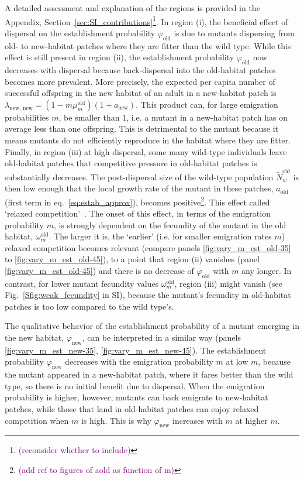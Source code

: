 \documentclass[11pt]{article}
\newcommand{\florence}[1]{\textcolor{purple}{(#1)}} %
\begin{document}
A detailed assessment and explanation of the regions is provided in the Appendix, Section~\ref{sec:SI_contributions}\footnote{\florence{reconsider whether to include}}. In region (i), the beneficial effect of dispersal on the establishment probability $\varphi_{\text{old}}$ is due to mutants dispersing from old- to new-habitat patches where they are fitter than the wild type. 
While this effect is still present in region (ii), the establishment probability $\varphi_{\text{old}}$ now decreases with dispersal   because back-dispersal into the old-habitat patches becomes more prevalent. More precisely, the expected per capita number of successful offspring in the new habitat of an adult in a new-habitat patch is $\lambda_{\text{new, new}} = (1- m \mu_m^{\text{old}}) (1+a_{\text{new}})$. This product can, for large emigration probabilities $m$, be smaller than $1$, i.e. a mutant in a new-habitat patch has on average less than one offspring. This is detrimental to the mutant because it means mutants do not efficiently reproduce in the habitat where they are fitter. 
Finally, in region (iii) at high dispersal, some many wild-type individuals leave old-habitat patches that competitive pressure in old-habitat patches is substantially decreases. The post-dispersal size of the wild-type population $\widetilde{N}^{\text{old}}_w$ is then low enough that the local growth rate of the mutant in these patches, $a_{\text{old}}$ (first term in eq.~\eqref{eq:estab_approx}), becomes positive\footnote{\florence{add ref to figures of aold as function of m}}. This effect called `relaxed competition'~\citep{uecker_2014}. The onset of this effect, in terms of the emigration probability $m$, is strongly dependent on the fecundity of the mutant in the old habitat, $\omega_{m}^{\text{old}}$. The larger it is, the `earlier' (i.e. for smaller emigration rates $m$) relaxed competition becomes relevant (compare panels \ref{fig:vary_m_est_old-35} to \ref{fig:vary_m_est_old-45}), to a point that region (ii) vanishes (panel \ref{fig:vary_m_est_old-45}) and there is no decrease of $\varphi_{\text{old}}$ with $m$ any longer. In contrast, for lower mutant fecundity values $\omega^\text{old}_m$, region (iii) might vanish (see Fig.~\ref{Sfig:weak_fecundity} in SI), because the mutant's fecundity in old-habitat patches is too low compared to the wild type's. 

The qualitative behavior of the establishment probability of a mutant emerging in the new habitat, $\varphi_{\text{new}}$, can be interpreted in a similar way (panels \ref{fig:vary_m_est_new-35}, \ref{fig:vary_m_est_new-45}). The establishment probability $\varphi_{\text{new}}$ decreases with the emigration probability $m$ at low $m$, because the mutant appeared in a new-habitat patch, where it fares better than the wild type, so there is no initial benefit due to dispersal. When the emigration probability is higher, however, mutants can back emigrate to new-habitat patches, while those that land in old-habitat patches can enjoy relaxed competition when $m$ is high. This is why $\varphi_{\text{new}}$ increases with $m$ at higher $m$. %
\end{document}
